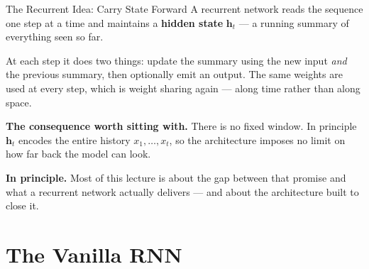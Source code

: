\documentclass[aspectratio=169, 11pt]{beamer}
\begin{document}
\begin{frame}{The Recurrent Idea: Carry State Forward}
  A recurrent network reads the sequence one step at a time and maintains a \textbf{hidden state}
  $\mathbf{h}_t$ --- a running summary of everything seen so far.

  \vspace{0.15cm}
  At each step it does two things: update the summary using the new input \emph{and} the previous
  summary, then optionally emit an output. The same weights are used at every step, which is
  weight sharing again --- along time rather than along space.

  \vspace{0.15cm}
  \textbf{The consequence worth sitting with.} There is no fixed window. In principle
  $\mathbf{h}_t$ encodes the entire history $x_1, \ldots, x_t$, so the architecture imposes no
  limit on how far back the model can look.

  \vspace{0.15cm}
  \textbf{In principle.} Most of this lecture is about the gap between that promise and what a
  recurrent network actually delivers --- and about the architecture built to close it.
\end{frame}

\section{The Vanilla RNN}

\end{document}
